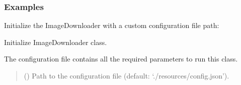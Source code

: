 \documentclass[letterpaper,10pt,english]{sphinxmanual}
\begin{document}
\subsubsection*{Examples}

\sphinxAtStartPar
Initialize the ImageDownloader with a custom configuration file path:

\begin{sphinxVerbatim}[commandchars=\\\{\}]
  
\end{sphinxVerbatim}

\begin{fulllineitems}
\label{\detokenize{index:gebot.ImageDownloader.__init__}}
\pysigstartsignatures
{}
\pysigstopsignatures
\sphinxAtStartPar
Initialize ImageDownloader class.

\sphinxAtStartPar
The configuration file contains all the required parameters to run this class.
\begin{quote}\begin{description}
\sphinxAtStartPar
{} (\sphinxstyleliteralemphasis{\sphinxupquote{, }}) \textendash{} Path to the configuration file (default: ‘./resources/config.json’).

\end{description}\end{quote}

\end{fulllineitems}

\end{document}
